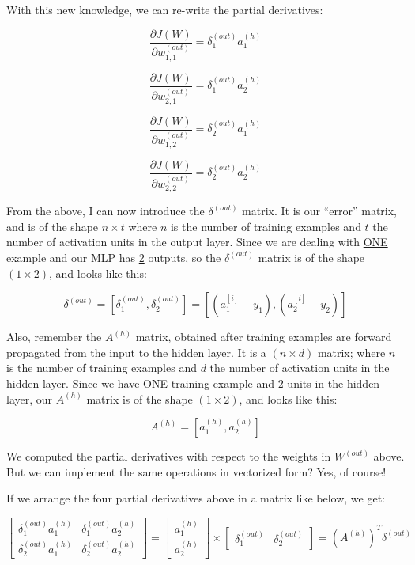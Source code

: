 \documentclass[12pt, letterpaper]{article}
\begin{document}
\vspace{5mm} %

With this new knowledge, we can re-write the partial derivatives:

\[
    \frac{\partial J(W)}{\partial w_{1,1}^{(out)}} =
    \delta_1^{(out)} a_1^{(h)}
\]

\[
    \frac{\partial J(W)}{\partial w_{2,1}^{(out)}} =
    \delta_1^{(out)} a_2^{(h)}
\]

\[
    \frac{\partial J(W)}{\partial w_{1,2}^{(out)}} =
    \delta_2^{(out)} a_1^{(h)}
\]

\[
    \frac{\partial J(W)}{\partial w_{2,2}^{(out)}} =
    \delta_2^{(out)} a_2^{(h)}
\]

From the above, I can now introduce the $\delta^{(out)}$ matrix.
It is our ``error'' matrix, and is of the shape $n \times t$ 
where $n$ is the number of training examples and $t$ the number 
of activation units in the output layer. Since we are dealing with
\underline{ONE} example and our MLP has \underline{2} outputs, so 
the $\delta^{(out)}$ matrix is of the shape $(1 \times 2)$, and 
looks like this:

\[
    \delta^{(out)} = [\delta_1^{(out)}, \delta_2^{(out)}] =
    [(a_{1}^{[i]} - y_1), (a_{2}^{[i]} - y_2)]
\]

\vspace{5mm} %

Also, remember the $A^{(h)}$ matrix, obtained after training
examples are forward propagated from the input to the hidden layer.
It is a $(n \times d)$ matrix; where $n$ is the number of training
examples and $d$ the number of activation units in the hidden layer.
Since we have \underline{ONE} training example and \underline{2}
units in the hidden layer, our $A^{(h)}$ matrix is of the shape
$(1 \times 2)$, and looks like this:

\[
    A^{(h)} = [a_1^{(h)}, a_2^{(h)}]
\]

We computed the partial derivatives with respect to the weights in
$W^{(out)}$ above. But we can implement the same operations in 
vectorized form? Yes, of course!

\vspace{5mm} %

If we arrange the four partial derivatives above in a matrix like
below, we get:

\[
    \begin{bmatrix}
        \delta_1^{(out)} a_1^{(h)} & \delta_1^{(out)} a_2^{(h)} \\
        \delta_2^{(out)} a_1^{(h)} & \delta_2^{(out)} a_2^{(h)}
    \end{bmatrix}
    =
    \begin{bmatrix}
        a_1^{(h)} \\
        a_2^{(h)}
    \end{bmatrix}
    \times
    \begin{bmatrix}
        \delta_1^{(out)} & \delta_2^{(out)}
    \end{bmatrix}
    = 
    (A^{(h)})^{T} \delta^{(out)}
\]
\end{document}
